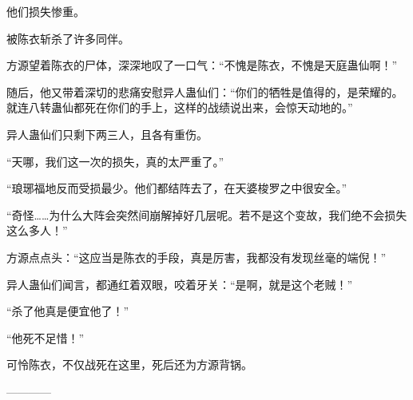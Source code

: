 \begin{this_body}
他们损失惨重。

被陈衣斩杀了许多同伴。

方源望着陈衣的尸体，深深地叹了一口气：“不愧是陈衣，不愧是天庭蛊仙啊！”

随后，他又带着深切的悲痛安慰异人蛊仙们：“你们的牺牲是值得的，是荣耀的。就连八转蛊仙都死在你们的手上，这样的战绩说出来，会惊天动地的。”

异人蛊仙们只剩下两三人，且各有重伤。

“天哪，我们这一次的损失，真的太严重了。”

“琅琊福地反而受损最少。他们都结阵去了，在天婆梭罗之中很安全。”

“奇怪……为什么大阵会突然间崩解掉好几层呢。若不是这个变故，我们绝不会损失这么多人！”

方源点点头：“这应当是陈衣的手段，真是厉害，我都没有发现丝毫的端倪！”

异人蛊仙们闻言，都通红着双眼，咬着牙关：“是啊，就是这个老贼！”

“杀了他真是便宜他了！”

“他死不足惜！”

可怜陈衣，不仅战死在这里，死后还为方源背锅。

------------

\end{this_body}

